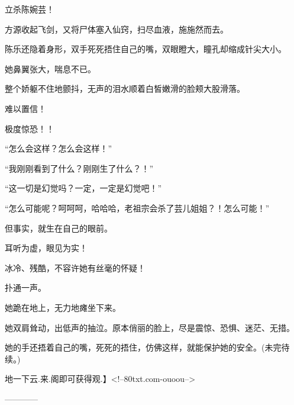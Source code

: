 \begin{this_body}
立杀陈婉芸！

方源收起飞剑，又将尸体塞入仙窍，扫尽血液，施施然而去。

陈乐还隐着身形，双手死死捂住自己的嘴，双眼瞪大，瞳孔却缩成针尖大小。

她鼻翼张大，喘息不已。

整个娇躯不住地颤抖，无声的泪水顺着白皙嫩滑的脸颊大股滑落。

难以置信！

极度惊恐！！

“怎么会这样？怎么会这样！”

“我刚刚看到了什么？刚刚生了什么？！”

“这一切是幻觉吗？一定，一定是幻觉吧！”

“怎么可能呢？呵呵呵，哈哈哈，老祖宗会杀了芸儿姐姐？！怎么可能！”

但事实，就生在自己的眼前。

耳听为虚，眼见为实！

冰冷、残酷，不容许她有丝毫的怀疑！

扑通一声。

她跪在地上，无力地瘫坐下来。

她双肩耸动，出低声的抽泣。原本俏丽的脸上，尽是震惊、恐惧、迷茫、无措。

她的手还捂着自己的嘴，死死的捂住，仿佛这样，就能保护她的安全。(未完待续。)

地一下云.来.阁即可获得观.】<!--80txt.com-ouoou-->

------------

\end{this_body}

